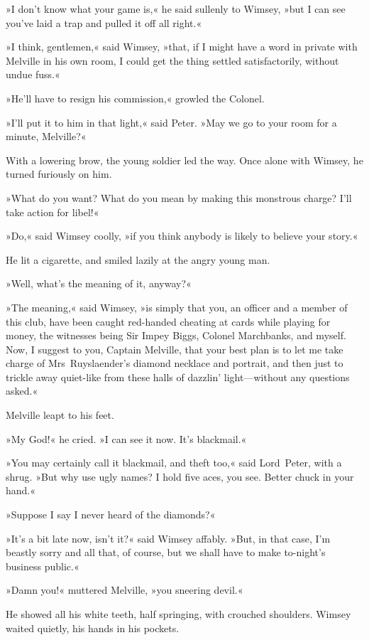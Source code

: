 »I don't know what your game is,« he said sullenly to Wimsey, »but I can see you've laid a trap and pulled it off all right.«

»I think, gentlemen,« said Wimsey, »that, if I might have a word in private with Melville in his own room, I could get the thing settled satisfactorily, without undue fuss.«

»He'll have to resign his commission,« growled the Colonel.

»I'll put it to him in that light,« said Peter. »May we go to your room for a minute, Melville?«

With a lowering brow, the young soldier led the way. Once alone with Wimsey, he turned furiously on him.

»What do you want? What do you mean by making this monstrous charge? I'll take action for libel!«

»Do,« said Wimsey coolly, »if you think anybody is likely to believe your story.«

He lit a cigarette, and smiled lazily at the angry young man.

»Well, what's the meaning of it, anyway?«

»The meaning,« said Wimsey, »is simply that you, an officer and a member of this club, have been caught red-handed cheating at cards while playing for money, the witnesses being Sir Impey Biggs, Colonel Marchbanks, and myself. Now, I suggest to you, Captain Melville, that your best plan is to let me take charge of Mrs~Ruyslaender's diamond necklace and portrait, and then just to trickle away quiet-like from these halls of dazzlin' light—without any questions asked.«

Melville leapt to his feet.

»My God!« he cried. »I can see it now. It's blackmail.«

»You may certainly call it blackmail, and theft too,« said Lord~Peter, with a shrug. »But why use ugly names? I hold five aces, you see. Better chuck in your hand.«

»Suppose I say I never heard of the diamonds?«

»It's a bit late now, isn't it?« said Wimsey affably. »But, in that case, I'm beastly sorry and all that, of course, but we shall have to make to-night's business public.«

»Damn you!« muttered Melville, »you sneering devil.«

He showed all his white teeth, half springing, with crouched shoulders. Wimsey waited quietly, his hands in his pockets.

